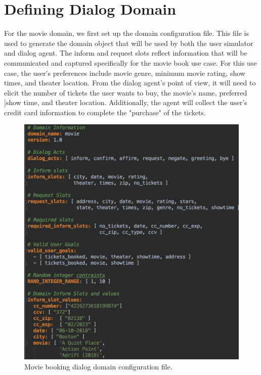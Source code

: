 \section{Defining Dialog Domain}

For the movie domain, we first set up the domain configuration file. This file is used to generate the domain object that will be used by both the user simulator and dialog agent. The inform and request slots reflect information that will be communicated and captured specifically for the movie book use case. For this use case, the user's preferences include movie genre, minimum movie rating, show times, and theater location. From the dialog agent's point of view, it will need to elicit the number of tickets the user wants to buy, the movie's name, preferred ]show time, and theater location. Additionally, the agent will collect the user's credit card information to complete the "purchase" of the tickets. 

\begin{figure}[h!]
	\centering
	\includegraphics[scale=.25]{diagrams/movie_dialog_domain.jpeg}
	\caption{ Movie booking dialog domain configuration file. }
	\label{fig:movie_domain}
\end{figure}

